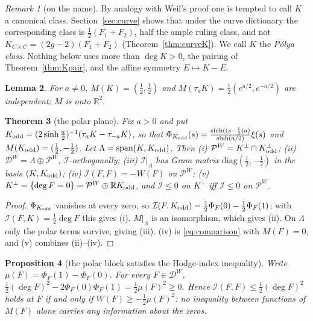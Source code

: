 \documentclass[11pt]{amsart}
\newtheorem{theorem}{Theorem}[section]
\newtheorem{proposition}[theorem]{Proposition}
\newtheorem{lemma}[theorem]{Lemma}
\theoremstyle{definition}
\theoremstyle{remark}
\newtheorem{remark}[theorem]{Remark}
\newcommand{\R}{\mathbb R}
\newcommand{\DW}{\mathcal D^{W}}
\newcommand{\PW}{\mathcal P^{W}}
\newcommand{\I}{\mathcal I}
\newcommand{\dg}{\deg}
\begin{document}
\begin{remark}[on the name]\label{rem:name}
By analogy with Weil's proof one is tempted to call $K$ a canonical class. Section~\ref{sec:curve}
shows that under the curve dictionary the corresponding class is $\frac12(F_1+F_2)$, half the ample
ruling class, and not $K_{C\times C}=(2g-2)(F_1+F_2)$ (Theorem~\ref{thm:curveK}). We call $K$ the
\emph{P\'olya class}. Nothing below uses more than $\dg K>0$, the pairing of
Theorem~\ref{thm:Kpair}, and the affine symmetry $E\mapsto K-E$.
\end{remark}

\begin{lemma}\label{lem:Msurj}
For $a\ne0$, $M(K)=(\frac12,\frac12)$ and $M(\tau_aK)=\frac12(e^{a/2},e^{-a/2})$ are independent; $M$ is onto $\R^2$.
\end{lemma}

\begin{theorem}[the polar plane]\label{thm:split}
Fix $a>0$ and put $K_{\rm odd}=(2\sinh\frac a2)^{-1}(\tau_aK-\tau_{-a}K)$, so that
$\Phi_{K_{\rm odd}}(s)=\frac{\sinh((s-\frac12)a)}{\sinh(a/2)}\xi(s)$ and $M(K_{\rm odd})=(\frac12,-\frac12)$.
Let $\Lambda=\mathrm{span}(K,K_{\rm odd})$. Then
(i) $\PW=K^\perp\cap K_{\rm odd}^\perp$;
(ii) $\DW=\Lambda\oplus\PW$, $\I$-orthogonally;
(iii) $\I|_\Lambda$ has Gram matrix $\mathrm{diag}(\frac12,-\frac12)$ in the basis $(K,K_{\rm odd})$;
(iv) $\I(F,F)=-W(F)$ on $\PW$;
(v) $K^\perp=\{\dg F=0\}=\PW\oplus\R K_{\rm odd}$, and $\I\le0$ on $K^\perp$ iff $\I\le0$ on $\PW$.
\end{theorem}
\begin{proof}
$\Phi_{K_{\rm odd}}$ vanishes at every zero, so $\I(F,K_{\rm odd})=\frac12\Phi_F(0)-\frac12\Phi_F(1)$; with
$\I(F,K)=\frac12\dg F$ this gives (i). $M|_\Lambda$ is an isomorphism, which gives (ii). On $\Lambda$ only the
polar terms survive, giving (iii). (iv) is \eqref{eq:comparison} with $M(F)=0$, and (v) combines (ii)--(iv).
\end{proof}

\begin{proposition}[the polar block satisfies the Hodge-index inequality]\label{prop:slack}
Write $\mu(F)=\Phi_F(1)-\Phi_F(0)$. For every $F\in\DW$,
$\frac12(\dg F)^2-2\Phi_F(0)\Phi_F(1)=\frac12\mu(F)^2\ge0$. Hence $\I(F,F)\le\frac12(\dg F)^2$ holds at $F$
if and only if $W(F)\ge-\frac12\mu(F)^2$: no inequality between functions of $M(F)$ alone carries any
information about the zeros.
\end{proposition}
\end{document}

